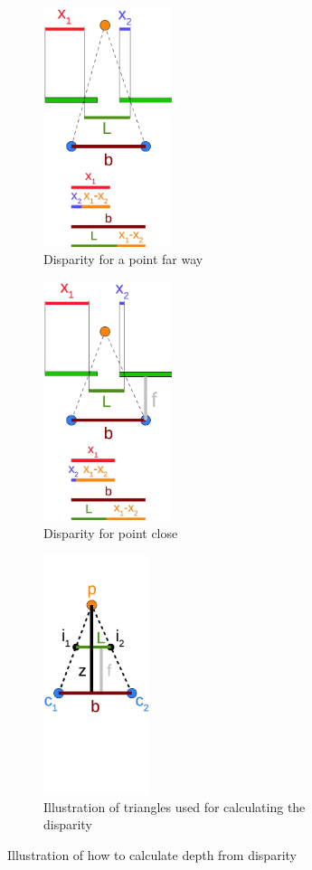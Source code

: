 \begin{figure}[ht]
  \centering
  \begin{subfigure}[t]{0.3\textwidth}
    \centering\includegraphics[height=7cm]{figures/disp_long.jpg}
    \caption{Disparity for a point far way\label{fig:disp_long}}
  \end{subfigure}\hspace{0.5cm}
  \begin{subfigure}[t]{0.3\textwidth}
    \centering\includegraphics[height=7cm]{figures/disp_short}
    \caption{Disparity for point close\label{fig:disp_short}}
  \end{subfigure}\hspace{0.5cm}
  \begin{subfigure}[t]{0.3\textwidth}
    \centering\includegraphics[height=7cm]{figures/bfz_disp}
    \caption{Illustration of triangles used for calculating the disparity\label{fig:bfz_disp}}
  \end{subfigure}
  \caption{Illustration of how to calculate depth from disparity\label{fig:dispall}}
\end{figure}

